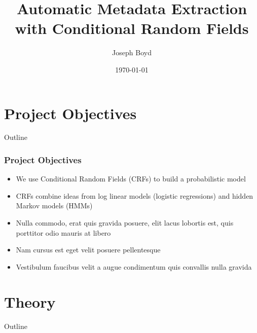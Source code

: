 \documentclass{beamer}
\title[Automatic Metadata Extraction]{Automatic Metadata Extraction with Conditional Random Fields} %
\author{Joseph Boyd} %
\institute[EPFL] %
{
\'Ecole Polytechnique F\'ed\'erale de Lausanne \\ %
\medskip
\textit{joseph.boyd@epfl.ch} %
}
\date{\today} %
\begin{document}
\begin{frame}
\titlepage %
\end{frame}


\section{Project Objectives}
\begin{frame}[noframenumbering]{Outline}
\tableofcontents[currentsection]
\end{frame}


\begin{frame}
\frametitle{Project Objectives}
\begin{itemize}
\item We use Conditional Random Fields (CRFs) to build a probabilistic model
\item CRFs combine ideas from log linear models (logistic regressions) and hidden Markov models (HMMs)
\item Nulla commodo, erat quis gravida posuere, elit lacus lobortis est, quis porttitor odio mauris at libero
\item Nam cursus est eget velit posuere pellentesque
\item Vestibulum faucibus velit a augue condimentum quis convallis nulla gravida
\end{itemize}
\end{frame}


\section{Theory}
\begin{frame}[noframenumbering]{Outline}
\tableofcontents[currentsection]
\end{frame}

\end{document}
